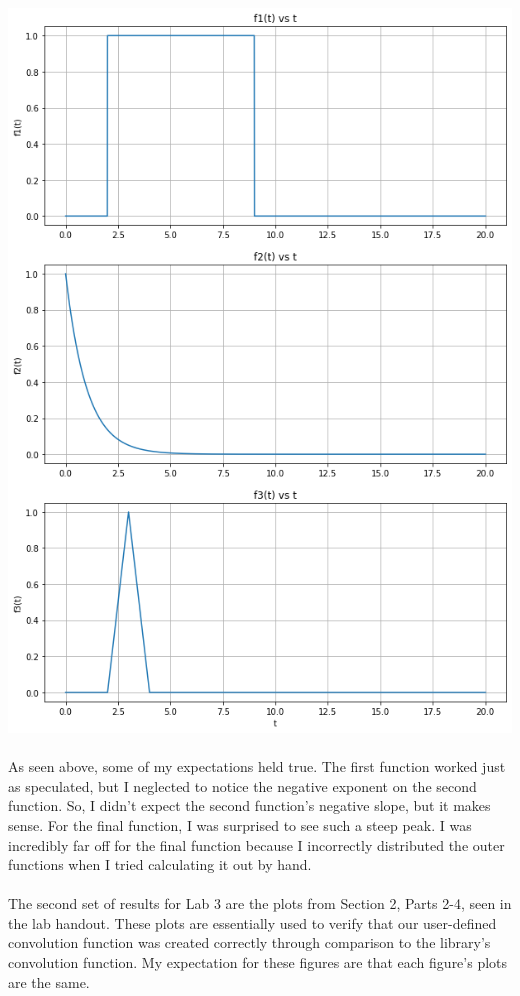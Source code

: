 \documentclass[12pt]{report}
\begin{document}
    \includegraphics[scale=0.6]{functs 1-3.png}

    \paragraph{} As seen above, some of my expectations held true. The first function worked just as speculated, but I neglected to notice the negative exponent on the second function. So, I didn't expect the second function's negative slope, but it makes sense. For the final function, I was surprised to see such a steep peak. I was incredibly far off for the final function because I incorrectly distributed the outer functions when I tried calculating it out by hand.  

    \paragraph{} The second set of results for Lab 3 are the plots from Section 2, Parts 2-4, seen in the lab handout. These plots are essentially used to verify that our user-defined convolution function was created correctly through comparison to the library's convolution function. My expectation for these figures are that each figure's plots are the same. 
    
\end{document}
